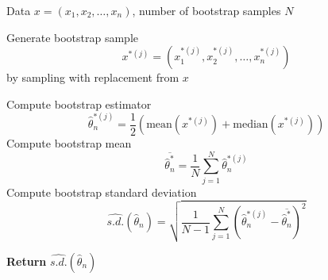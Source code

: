 \documentclass[8pt]{beamer}
\begin{document}
\begin{frame}
\begin{algorithm}[H]
\caption{Bootstrap Standard Deviation for Hybrid Estimator}
\begin{algorithmic}[1]

\Require Data $x=(x_1,x_2,\dots,x_n)$, number of bootstrap samples $N$

\State Generate bootstrap sample
\[
x^{*(j)} = (x^{*(j)}_1, x^{*(j)}_2, \dots, x^{*(j)}_n)
\]
by sampling with replacement from $x$

\State Compute bootstrap estimator
\[ \widehat{\theta}_n^{*(j)} = \frac{1}{2}
\left( \text{mean}(x^{*(j)}) + \text{median}(x^{*(j)}) \right) \]
\EndFor
\State Compute bootstrap mean
\[
\overline{\widehat{\theta}_n^*}
=
\frac{1}{N}
\sum_{j=1}^N
\widehat{\theta}_n^{*(j)}
\]
\State Compute bootstrap standard deviation
\[
\widehat{s.d.}(\widehat{\theta}_n) = \sqrt{ \frac{1}{N-1} \sum_{j=1}^N \left( \widehat{\theta}_n^{*(j)} - \overline{\widehat{\theta}_n^*} \right)^2 }
\]

\State \textbf{Return} $\widehat{s.d.}(\widehat{\theta}_n)$

\end{algorithmic}
\end{algorithm}
\end{frame}
\end{document}
